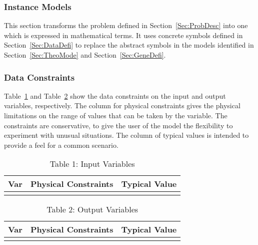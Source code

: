 \documentclass[12pt]{article}
\begin{document}
\subsubsection{Instance Models}
\label{Sec:IM}
This section transforms the problem defined in Section~\ref{Sec:ProbDesc} into one which is expressed in mathematical terms. It uses concrete symbols defined in Section~\ref{Sec:DataDefi} to replace the abstract symbols in the models identified in Section~\ref{Sec:TheoMode} and Section~\ref{Sec:GeneDefi}.
\subsubsection{Data Constraints}
\label{Sec:DC}
Table~\ref{Table:T1IV} and Table~\ref{Table:T2OV} show the data constraints on the input and output variables, respectively. The column for physical constraints gives the physical limitations on the range of values that can be taken by the variable. The constraints are conservative, to give the user of the model the flexibility to experiment with unusual situations. The column of typical values is intended to provide a feel for a common scenario.
\begin{longtable}{l l l}
\toprule
Var & Physical Constraints & Typical Value
\\
\midrule
\bottomrule
\caption{Table 1: Input Variables}
\label{Table:T1IV}
\end{longtable}
\begin{longtable}{l l l}
\toprule
Var & Physical Constraints & Typical Value
\\
\midrule
\bottomrule
\caption{Table 2: Output Variables}
\label{Table:T2OV}
\end{longtable}
\end{document}
